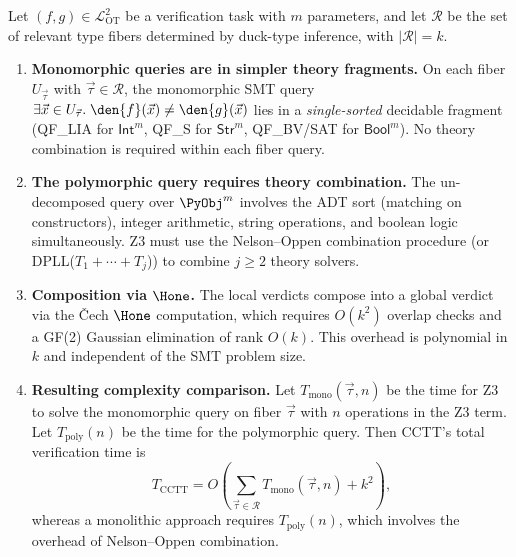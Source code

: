 \begin{theorem}
\label{thm:fiber-decomp}
Let $(f, g) \in \mathcal{L}_{\mathrm{OT}}^2$ be a verification task
with $m$ parameters, and let $\mathcal{R}$ be the set of relevant
type fibers determined by duck-type inference, with
$|\mathcal{R}| = k$.

\begin{enumerate}[label=(\alph*)]
  \item \textbf{Monomorphic queries are in simpler theory fragments.}
    On each fiber $U_{\vec{\tau}}$ with $\vec{\tau} \in \mathcal{R}$,
    the monomorphic SMT query
    $\exists \vec{x} \in U_{\vec{\tau}}.\; \den{f}(\vec{x}) \neq
    \den{g}(\vec{x})$ lies in a \emph{single-sorted} decidable
    fragment (QF\_LIA for $\mathsf{Int}^m$, QF\_S for
    $\mathsf{Str}^m$, QF\_BV/SAT for $\mathsf{Bool}^m$).  No
    theory combination is required within each fiber query.

  \item \textbf{The polymorphic query requires theory combination.}
    The un-decomposed query over $\PyObj^m$ involves the ADT sort
    (matching on constructors), integer arithmetic, string operations,
    and boolean logic simultaneously.  Z3 must use the Nelson--Oppen
    combination procedure (or DPLL($T_1 + \cdots + T_j$)) to combine
    $j \geq 2$ theory solvers.

  \item \textbf{Composition via $\Hone$.}
    The local verdicts compose into a global verdict via the \v{C}ech
    $\Hone$ computation, which requires $O(k^2)$ overlap checks and
    a GF(2) Gaussian elimination of rank $O(k)$.  This overhead is
    polynomial in $k$ and independent of the SMT problem size.

  \item \textbf{Resulting complexity comparison.}
    Let $T_{\mathrm{mono}}(\vec{\tau}, n)$ be the time for Z3 to solve
    the monomorphic query on fiber $\vec{\tau}$ with $n$ operations in
    the Z3 term.  Let $T_{\mathrm{poly}}(n)$ be the time for the
    polymorphic query.  Then CCTT's total verification time is
    \[
      T_{\mathrm{CCTT}} = O\!\left(
        \sum_{\vec{\tau}\in\mathcal{R}}
          T_{\mathrm{mono}}(\vec{\tau}, n)
        + k^2
      \right),
    \]
    whereas a monolithic approach requires $T_{\mathrm{poly}}(n)$,
    which involves the overhead of Nelson--Oppen combination.
\end{enumerate}
\end{theorem}

